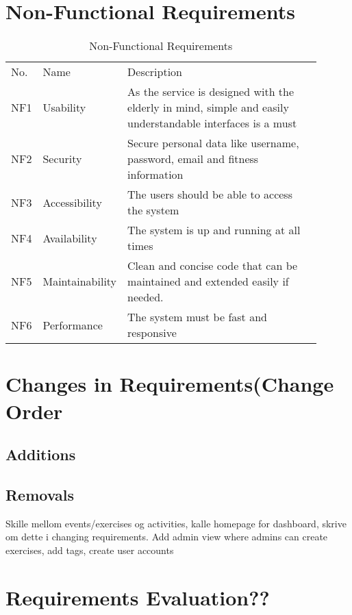 \section{Non-Functional Requirements}

\begin{table} [H]\centering
    \begin{tabular}{ |C{0.05\linewidth}|C{0.15\linewidth}|L{0.7\linewidth}| } 
 \hline {}
  \\
 \hline
 No. & Name & Description \\
 \hline
 NF1 & Usability & As the service is designed with the elderly in mind, simple and easily understandable interfaces is a must \\ 
 \hline
 NF2 & Security & Secure personal data like username, password, email and fitness information \\ 
  \hline
 NF3 & Accessibility & The users should be able to access the system \\
  \hline
 NF4 & Availability & The system is up and running at all times \\
  \hline
 NF5 & Maintainability & Clean and concise code that can be maintained and extended easily if needed. \\
  \hline
 NF6 & Performance & The system must be fast and responsive \\
 
 \hline
\end{tabular}
\caption{Non-Functional Requirements}
\end{table}

\section{Changes in Requirements(Change Order}
\subsection{Additions}
\subsection{Removals}
Skille mellom events/exercises og activities, kalle homepage for dashboard, skrive om dette i changing requirements.
Add admin view where admins can create exercises, add tags, create user accounts

\section{Requirements Evaluation??}